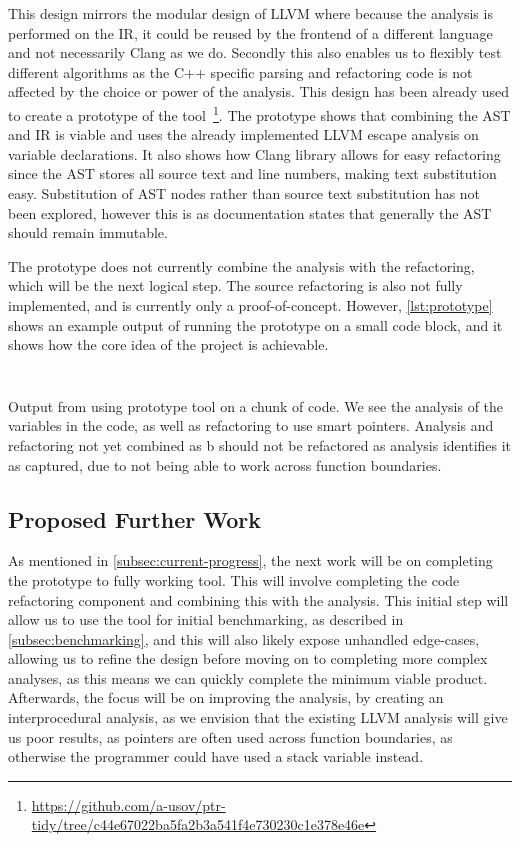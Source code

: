 \documentclass{proposal}
\begin{document}
    This design mirrors the modular design of LLVM where because the analysis is performed on the IR, it could be reused by the frontend of a different language and not necessarily Clang as we do.
    Secondly this also enables us to flexibly test different algorithms as the C++ specific parsing and refactoring code is not affected by the choice or power of the analysis.
    This design has been already used to create a prototype of the tool~\footnote{\url{https://github.com/a-usov/ptr-tidy/tree/c44e67022ba5fa2b3a541f4e730230c1e378e46e}}.
    The prototype shows that combining the AST and IR is viable and uses the already implemented LLVM escape analysis on variable declarations.
    It also shows how Clang library allows for easy refactoring since the AST stores all source text and line numbers, making text substitution easy.
    Substitution of AST nodes rather than source text substitution has not been explored, however this is as documentation states that generally the AST should remain immutable.

    The prototype does not currently combine the analysis with the refactoring, which will be the next logical step.
    The source refactoring is also not fully implemented, and is currently only a proof-of-concept.
    However, \autoref{lst:prototype} shows an example output of running the prototype on a small code block, and it shows how the core idea of the project is achievable.

    \begin{listing}
        \inputminted{c++}{code/prototype-input.cpp}
        \inputminted{text}{code/prototype-output.txt}
        \caption{Output from using prototype tool on a chunk of code. We see the analysis of the variables in the code, as well as refactoring to use smart pointers. Analysis and refactoring not yet combined as b should not be refactored as analysis identifies it as captured, due to not being able to work across function boundaries.}
        \label{lst:prototype}
    \end{listing}

    \subsection{Proposed Further Work}\label{subsec:proposed-further-work}

    As mentioned in \autoref{subsec:current-progress}, the next work will be on completing the prototype to fully working tool.
    This will involve completing the code refactoring component and combining this with the analysis.
    This initial step will allow us to use the tool for initial benchmarking, as described in \autoref{subsec:benchmarking}, and this will also likely expose unhandled edge-cases, allowing us to refine the design before moving on to completing more complex analyses, as this means we can quickly complete the minimum viable product.
    Afterwards, the focus will be on improving the analysis, by creating an interprocedural analysis, as we envision that the existing LLVM analysis will give us poor results, as pointers are often used across function boundaries, as otherwise the programmer could have used a stack variable instead.
\end{document}
